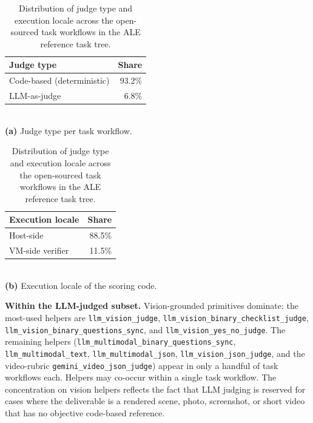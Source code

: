 \documentclass{llmxive}
\begin{document}
\begin{table}[htbp]
    \centering
    \footnotesize
    \begin{minipage}[t]{0.48\textwidth}
        \centering
        \begin{tabular}{l r}
            \toprule
            \textbf{Judge type} & \textbf{Share}\\
            \midrule
            Code-based (deterministic)   & 93.2\%\\
            LLM-as-judge                 &  6.8\%\\
            \bottomrule
        \end{tabular}
        \\[0.4em]
        \textbf{(a)} Judge type per task workflow.
    \end{minipage}\hfill
    \begin{minipage}[t]{0.48\textwidth}
        \centering
        \begin{tabular}{l r}
            \toprule
            \textbf{Execution locale} & \textbf{Share}\\
            \midrule
            Host-side                       & 88.5\%\\
            VM-side verifier                & 11.5\%\\
            \bottomrule
        \end{tabular}
        \\[0.4em]
        \textbf{(b)} Execution locale of the scoring code.
    \end{minipage}
    \caption{Distribution of judge type and execution locale across the open-sourced task workflows in the ALE reference task tree.}
    \label{tab:judge-stats}
\end{table}

\noindent \textbf{Within the LLM-judged subset.}
Vision-grounded primitives dominate: the most-used helpers are \texttt{llm\_vision\_judge}, \texttt{llm\_vision\_binary\_checklist\_judge}, \texttt{llm\_vision\_binary\_questions\_sync}, and \texttt{llm\_vision\_yes\_no\_judge}. The remaining helpers (\texttt{llm\_multimodal\_binary\_questions\_sync}, \texttt{llm\_multimodal\_text}, \texttt{llm\_multimodal\_json}, \texttt{llm\_vision\_json\_judge}, and the video-rubric \texttt{gemini\_video\_json\_judge}) appear in only a handful of task workflows each. Helpers may co-occur within a single task workflow. The concentration on vision helpers reflects the fact that LLM judging is reserved for cases where the deliverable is a rendered scene, photo, screenshot, or short video that has no objective code-based reference.
\end{document}
